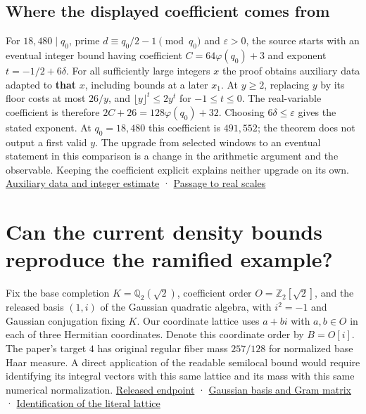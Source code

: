 \documentclass[11pt,letterpaper]{article}
\begin{document}
\subsection{Where the displayed coefficient comes from}

For $18{,}480\mid q_0$, prime $d\equiv q_0/2-1\pmod{q_0}$ and $\varepsilon >0$, the source starts with an eventual integer bound having coefficient $C=64\varphi(q_0)+3$ and exponent $t=-1/2+6\delta $. For all sufficiently large integers $x$ the proof obtains auxiliary data adapted to \textbf{that} $x$, including bounds at a later $x_1$. At $y\ge 2$, replacing $y$ by its floor costs at most $26/y$, and $\lfloor y\rfloor^t\le 2y^t$ for $-1\le t\le 0$. The real-variable coefficient is therefore $2C+26=128\varphi(q_0)+32$. Choosing $6\delta \le \varepsilon $ gives the stated exponent. At $q_0=18{,}480$ this coefficient is $491{,}552$; the theorem does not output a first valid $y$. The upgrade from selected windows to an eventual statement in this comparison is a change in the arithmetic argument and the observable. Keeping the coefficient explicit explains neither upgrade on its own. \href{https://github.com/nousentllc/riemann-hypothesis/blob/e063a923620ee7787b4a1270421478645bf66bdb/src/New/Reduction/OneSidedBound.lean#L69-L153}{Auxiliary data and integer estimate} · \href{https://github.com/nousentllc/riemann-hypothesis/blob/e063a923620ee7787b4a1270421478645bf66bdb/src/New/Reduction/OneSidedBound.lean#L196-L231}{Passage to real scales}

\section{Can the current density bounds reproduce the ramified example?}

Fix the base completion $K=\mathbb Q_2(\sqrt2)$, coefficient order $O=\mathbb Z_2[\sqrt2]$, and the released basis $(1,i)$ of the Gaussian quadratic algebra, with $i^2=-1$ and Gaussian conjugation fixing $K$. Our coordinate lattice uses $a+bi$ with $a,b\in O$ in each of three Hermitian coordinates. Denote this coordinate order by $B=O[i]$. The paper's target $4$ has original regular fiber mass $257/128$ for normalized base Haar measure. A direct application of the readable semilocal bound would require identifying its integral vectors with this same lattice and its mass with this same numerical normalization. \href{https://github.com/nousentllc/riemann-hypothesis/blob/17263859a4d27c62cfc67571737355f61a080806/research/uriel/experiments/ramified-square-dilates/dilates/DilateEndpoint.lean}{Released endpoint} · \href{https://github.com/nousentllc/riemann-hypothesis/blob/17263859a4d27c62cfc67571737355f61a080806/research/uriel/experiments/ramified-square-dilates/bridge/RamGlobal.lean}{Gaussian basis and Gram matrix} · \href{https://github.com/nousentllc/riemann-hypothesis/blob/17263859a4d27c62cfc67571737355f61a080806/research/uriel/experiments/ramified-square-dilates/dilates/DilateTransport.lean}{Identification of the literal lattice}
\end{document}
